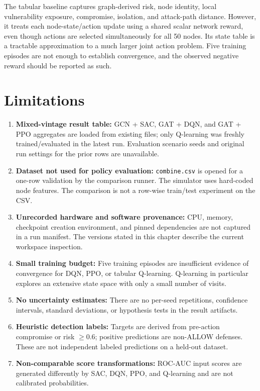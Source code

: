 \documentclass[12pt,a4paper]{report}
\newcommand{\code}[1]{\texttt{#1}}
\begin{document}
The tabular baseline captures graph-derived risk, node identity, local vulnerability exposure, compromise, isolation, and attack-path distance. However, it treats each node-state/action update using a shared scalar network reward, even though actions are selected simultaneously for all 50 nodes. Its state table is a tractable approximation to a much larger joint action problem. Five training episodes are not enough to establish convergence, and the observed negative reward should be reported as such.

\section{Limitations}

\begin{enumerate}[leftmargin=2em,label=\arabic*.]
  \item \textbf{Mixed-vintage result table:} GCN + SAC, GAT + DQN, and GAT + PPO aggregates are loaded from existing files; only Q-learning was freshly trained/evaluated in the latest run. Evaluation scenario seeds and original run settings for the prior rows are unavailable.
  \item \textbf{Dataset not used for policy evaluation:} \code{combine.csv} is opened for a one-row validation by the comparison runner. The simulator uses hard-coded node features. The comparison is not a row-wise train/test experiment on the CSV.
  \item \textbf{Unrecorded hardware and software provenance:} CPU, memory, checkpoint creation environment, and pinned dependencies are not captured in a run manifest. The versions stated in this chapter describe the current workspace inspection.
  \item \textbf{Small training budget:} Five training episodes are insufficient evidence of convergence for DQN, PPO, or tabular Q-learning. Q-learning in particular explores an extensive state space with only a small number of visits.
  \item \textbf{No uncertainty estimates:} There are no per-seed repetitions, confidence intervals, standard deviations, or hypothesis tests in the result artifacts.
  \item \textbf{Heuristic detection labels:} Targets are derived from pre-action compromise or risk $\geq 0.6$; positive predictions are non-ALLOW defenses. These are not independent labeled predictions on a held-out dataset.
  \item \textbf{Non-comparable score transformations:} ROC-AUC input scores are generated differently by SAC, DQN, PPO, and Q-learning and are not calibrated probabilities.

\end{enumerate}
\end{document}
